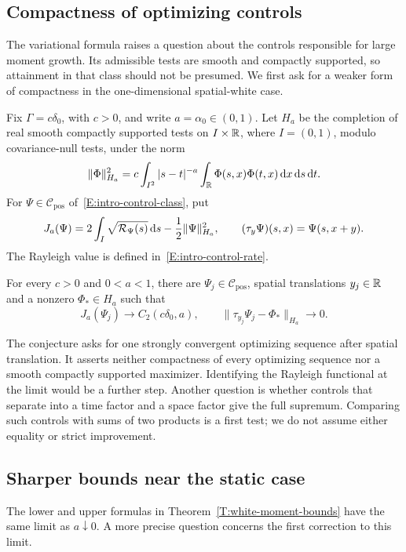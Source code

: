\subsection{Compactness of optimizing controls}\label{S:future-optimizers}
The variational formula raises a question about the controls responsible for
large moment growth. Its admissible tests are smooth and compactly supported,
so attainment in that class should not be presumed. We first ask for a weaker
form of compactness in the one-dimensional spatial-white case.

Fix $\Gamma = c\delta_0$, with $c > 0$, and write $a = \alpha_0 \in (0,1)$.
Let $H_a$ be the completion of real smooth compactly supported tests on
$I\times\mathbb{R}$, where $I = (0,1)$, modulo covariance-null tests, under the norm
\[
  \|\Phi\|_{H_a}^2
  =c\int_{I^2}|s-t|^{-a}\int_{\mathbb{R}}
  \Phi(s,x)\Phi(t,x)\,\mathrm{d} x\,\mathrm{d} s\,\mathrm{d} t.
\]
For $\Psi \in \mathcal{C}_{\mathrm{pos}}$
of~\eqref{E:intro-control-class}, put
\[
  J_a(\Psi)=2\int_I\sqrt{\mathcal{R}_\Psi(s)}\,\mathrm{d} s
  -\frac12\|\Psi\|_{H_a}^2,
  \qquad (\tau_y\Psi)(s,x)=\Psi(s,x+y).
\]
The Rayleigh value is defined in~\eqref{E:intro-control-rate}.

\begin{conjecture}
  \label{Conj:positive-control-compactness}
  For every $c > 0$ and $0 < a < 1$, there are
  $\Psi_j \in \mathcal{C}_{\mathrm{pos}}$, spatial translations $y_j \in \mathbb{R}$
  and a nonzero $\Phi_* \in H_a$ such that
  \[
    J_a(\Psi_j)\longrightarrow C_2(c\delta_0,a),
    \qquad
    \|\tau_{y_j}\Psi_j-\Phi_*\|_{H_a}\longrightarrow0.
  \]
\end{conjecture}

The conjecture asks for one strongly convergent optimizing sequence after
spatial translation. It asserts neither compactness of every optimizing
sequence nor a smooth compactly supported maximizer. Identifying the Rayleigh
functional at the limit would be a further step. Another question is whether
controls that separate into a time factor and a space factor give the full
supremum. Comparing such controls with sums of two products is a first test;
we do not assume either equality or strict improvement.

\subsection{Sharper bounds near the static case}\label{S:future-static-correction}
The lower and upper formulas in Theorem~\ref{T:white-moment-bounds} have the
same limit as $a\downarrow0$. A more precise question concerns the first
correction to this limit.

